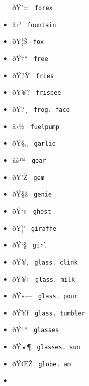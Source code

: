 \begin{itemize}
  \label{symbol-forex}{{ ðŸ'± } \texttt{\ forex\ }}
\item
  \label{symbol-fountain}{{ â›² } \texttt{\ fountain\ }}
\item
  \label{symbol-fox}{{ ðŸ¦Š } \texttt{\ fox\ }}
\item
  \label{symbol-free}{{ ðŸ†`` } \texttt{\ free\ }}
\item
  \label{symbol-fries}{{ ðŸ?Ÿ } \texttt{\ fries\ }}
\item
  \label{symbol-frisbee}{{ ðŸ¥? } \texttt{\ frisbee\ }}
\item
  \label{symbol-frog.face}{{ ðŸ?¸ }
  \texttt{\ frog.\ face\ }}
\item
  \label{symbol-fuelpump}{{ â›½ } \texttt{\ fuelpump\ }}
\item
  \label{symbol-garlic}{{ ðŸ§„ } \texttt{\ garlic\ }}
\item
  \label{symbol-gear}{{ âš™ } \texttt{\ gear\ }}
\item
  \label{symbol-gem}{{ ðŸ'Ž } \texttt{\ gem\ }}
\item
  \label{symbol-genie}{{ ðŸ§ž } \texttt{\ genie\ }}
\item
  \label{symbol-ghost}{{ ðŸ`» } \texttt{\ ghost\ }}
\item
  \label{symbol-giraffe}{{ ðŸ¦' } \texttt{\ giraffe\ }}
\item
  \label{symbol-girl}{{ ðŸ`§ } \texttt{\ girl\ }}
\item
  \label{symbol-glass.clink}{{ ðŸ¥‚ }
  \texttt{\ glass.\ clink\ }}
\item
  \label{symbol-glass.milk}{{ ðŸ¥› }
  \texttt{\ glass.\ milk\ }}
\item
  \label{symbol-glass.pour}{{ ðŸ«--- }
  \texttt{\ glass.\ pour\ }}
\item
  \label{symbol-glass.tumbler}{{ ðŸ¥ƒ }
  \texttt{\ glass.\ tumbler\ }}
\item
  \label{symbol-glasses}{{ ðŸ`\,`` }
  \texttt{\ glasses\ }}
\item
  \label{symbol-glasses.sun}{{ ðŸ•¶ }
  \texttt{\ glasses.\ sun\ }}
\item
  \label{symbol-globe.am}{{ ðŸŒŽ }
  \texttt{\ globe.\ am\ }}
\item

\end{itemize}
